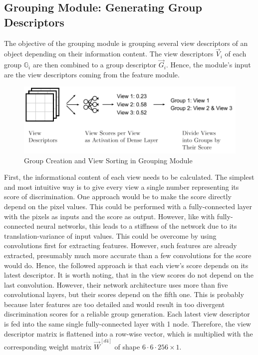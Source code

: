 \subsection{Grouping Module: Generating Group Descriptors}
\label{sec:architecture-grouping-module}
The objective of the grouping module is grouping several view descriptors of an object depending on their information content.
The view descriptors $\vec{V}_i$ of each group $\mathbb{G}_i$ are then combined to a group descriptor $\vec{G}_i$.
Hence, the module's input are the view descriptors coming from the feature module.
\begin{figure}
	\centering
	\includegraphics[]{images/grouping_module_groups.pdf}
	\caption{Group Creation and View Sorting in Grouping Module}
	\label{fig:grouping-module-groups}
\end{figure}
First, the informational content of each view needs to be calculated.
The simplest and most intuitive way is to give every view a single number representing its score of discrimination.
One approach would be to make the score directly depend on the pixel values.
This could be performed with a fully-connected layer with the pixels as inputs and the score as output.
However, like with fully-connected neural networks, this leads to a stiffness of the network due to its translation-variance of input values. 
This could be overcome by using convolutions first for extracting features.
However, such features are already extracted, presumably much more accurate than a few convolutions for the score would do. 
Hence, the followed approach is that each view's score depends on its latest descriptor.
It is worth noting, that in \cite{Feng2018} the view scores do not depend on the last convolution.
However, their network architecture uses more than five convolutional layers, but their scores depend on the fifth one.
This is probably because later features are too detailed and would result in too divergent discrimination scores for a reliable group generation.
Each latest view descriptor is fed into the same single fully-connected layer with 1 node.
Therefore, the view descriptor matrix is flattened into a row-wise vector, which is multiplied with the corresponding weight matrix $\vec{W}^{[d4]}$ of shape $6 \cdot 6 \cdot 256 \times 1$.
